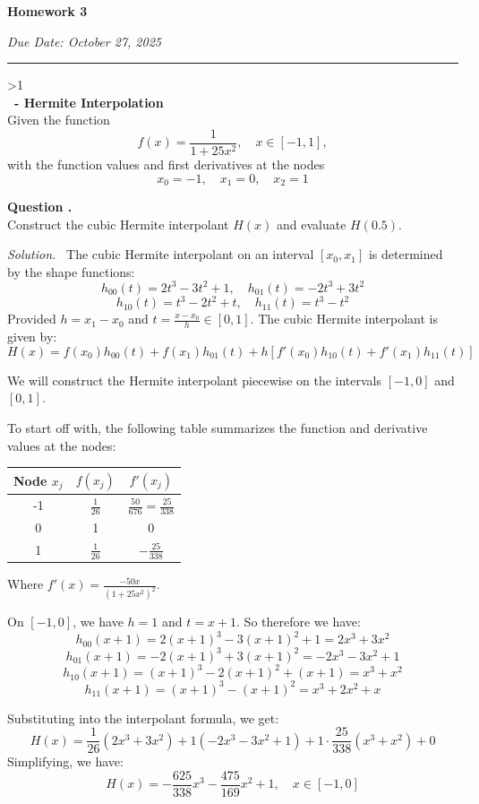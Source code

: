 \documentclass[12pt]{article}
\newcounter{question}
\newcounter{subquest}
\newcommand{\question}[1]{
    \stepcounter{question} 
    \ifnum\value{question}>1 \newpage \fi
    \vspace{1.5em}
    \textbf{\\ \Large\thequestion \ - #1}
    \vspace{.5em} 
    \setcounter{subquest}{0}\ \\}
\newcommand{\subquestion}[1][true]{
    \stepcounter{subquest} 
    \ifthenelse{\equal{#1}{true} \and \value{subquest}>1}{\newpage}{}
    \vspace{1em}
    \textbf{\large Question \thequestion.\thesubquest}
    \vspace{.5em}\ \\}
\newcommand{\solution}
    {\par\vspace{0.5em}\noindent\emph{Solution.}\ }
    {\par\vspace{1em}}
\begin{document}
\begin{center}
\textbf{\huge Homework 3}

{\large\emph{Due Date: October 27, 2025}}
\vspace{1em}
\end{center}
\hrule

\question{Hermite Interpolation}

Given the function 
\[f(x)=\frac{1}{1+25x^2}, \quad x\in[-1,1],\]
with the function values and first derivatives at the nodes 
\[x_0=-1, \quad x_1=0, \quad x_2=1 \]

\subquestion
Construct the cubic Hermite interpolant $H(x)$ and evaluate $H(0.5)$.

\solution
The cubic Hermite interpolant on an interval $[x_0, x_{1}]$ is determined by the shape functions:
\[h_{00}(t) = 2t^3 - 3t^2 + 1, \quad h_{01}(t) = -2t^3 + 3t^2\]
\[h_{10}(t) = t^3 - 2t^2 + t, \quad h_{11}(t) = t^3 - t^2\]
Provided $h=x_1-x_0$ and $t=\frac{x-x_0}{h} \in [0,1]$. 
The cubic Hermite interpolant is given by:
\[H(x) = f(x_0)h_{00}(t) + f(x_1)h_{01}(t) + h\left[f'(x_0)h_{10}(t) + f'(x_1)h_{11}(t)\right]\]

We will construct the Hermite interpolant piecewise on the intervals $[-1,0]$ and $[0,1]$.

To start off with, the following table summarizes the function and derivative values at the nodes:
\begin{center}
\begin{tabular}{|c|c|c|}
\hline
Node $x_j$ & $f(x_j)$ & $f'(x_j)$ \\
\hline
-1 & $\frac{1}{26}$ & $\frac{50}{676} = \frac{25}{338}$ \\
0 & 1 & 0 \\
1 & $\frac{1}{26}$ & $-\frac{25}{338}$ \\
\hline
\end{tabular}
\end{center}
Where $f'(x)=\frac{-50x}{(1+25x^2)^2}$.

On $[-1,0]$, we have $h=1$ and $t=x+1$. So therefore we have:
\[h_{00}(x+1) = 2(x+1)^3 - 3(x+1)^2 + 1 = 2x^3 + 3x^2\]
\[h_{01}(x+1) = -2(x+1)^3 + 3(x+1)^2 = -2x^3 - 3x^2 + 1\]
\[h_{10}(x+1) = (x+1)^3 - 2(x+1)^2 + (x+1) = x^3 + x^2\]
\[h_{11}(x+1) = (x+1)^3 - (x+1)^2 = x^3+2x^2+x\]

Substituting into the interpolant formula, we get:
\[H(x) = \frac{1}{26}(2x^3 + 3x^2) + 1(-2x^3 - 3x^2 + 1) + 1 \cdot \frac{25}{338}(x^3 + x^2) + 0\]
Simplifying, we have:
\[H(x) = -\frac{625}{338}x^3 - \frac{475}{169}x^2 + 1, \quad x\in[-1,0]\]
\end{document}
